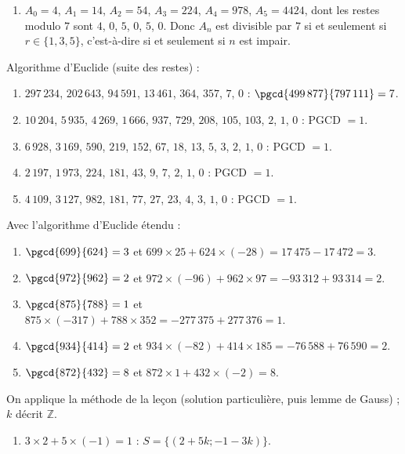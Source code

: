 \begin{corrige}
\begin{sol}
\begin{enumerate}
\item $A_0 = 4$, $A_1 = 14$, $A_2 = 54$, $A_3 = 224$, $A_4 = 978$, $A_5 = 4424$, dont les restes modulo $7$ sont
      $4$, $0$, $5$, $0$, $5$, $0$. Donc $A_n$ est divisible par $7$ si et seulement si $r \in \{1, 3, 5\}$,
      c'est-\`a-dire si et seulement si $n$ est impair.
\end{enumerate}
\end{sol}
%
\begin{sol}
Algorithme d'Euclide (suite des restes) :
\begin{enumerate}
\item $297\,234$, $202\,643$, $94\,591$, $13\,461$, $364$, $357$, $7$, $0$ : $\pgcd{499\,877}{797\,111} = 7$.
\item $10\,204$, $5\,935$, $4\,269$, $1\,666$, $937$, $729$, $208$, $105$, $103$, $2$, $1$, $0$ : PGCD $= 1$.
\item $6\,928$, $3\,169$, $590$, $219$, $152$, $67$, $18$, $13$, $5$, $3$, $2$, $1$, $0$ : PGCD $= 1$.
\item $2\,197$, $1\,973$, $224$, $181$, $43$, $9$, $7$, $2$, $1$, $0$ : PGCD $= 1$.
\item $4\,109$, $3\,127$, $982$, $181$, $77$, $27$, $23$, $4$, $3$, $1$, $0$ : PGCD $= 1$.
\end{enumerate}
\end{sol}
%
\begin{sol}
Avec l'algorithme d'Euclide \'etendu :
\begin{enumerate}
\item $\pgcd{699}{624} = 3$ et $699 \times 25 + 624 \times (-28) = 17\,475 - 17\,472 = 3$.
\item $\pgcd{972}{962} = 2$ et $972 \times (-96) + 962 \times 97 = -93\,312 + 93\,314 = 2$.
\item $\pgcd{875}{788} = 1$ et $875 \times (-317) + 788 \times 352 = -277\,375 + 277\,376 = 1$.
\item $\pgcd{934}{414} = 2$ et $934 \times (-82) + 414 \times 185 = -76\,588 + 76\,590 = 2$.
\item $\pgcd{872}{432} = 8$ et $872 \times 1 + 432 \times (-2) = 8$.
\end{enumerate}
\end{sol}
%
\begin{sol}
On applique la m\'ethode de la le\c{c}on (solution particuli\`ere, puis lemme de Gauss) ; $k$ d\'ecrit $\mathbb{Z}$.
\begin{enumerate}
\item $3 \times 2 + 5 \times (-1) = 1$ : $S = \{ (2 + 5k ; -1 - 3k) \}$.

\end{enumerate}
\end{sol}
\end{corrige}
